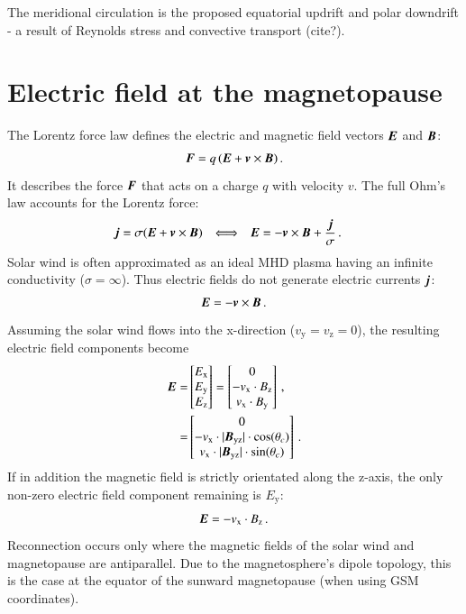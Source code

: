 
The meridional circulation is the proposed equatorial updrift and polar downdrift - a result of Reynolds stress and convective transport (cite?).\\


\section{Electric field at the magnetopause}
\label{sec:electric_field_at_the_magnetopause}
The Lorentz force law defines the electric and magnetic field vectors $\boldsymbol{E}$ and $\boldsymbol{B}$:
\begin{align}
	\boldsymbol{F} = q\,(\boldsymbol{E} + \boldsymbol{v} \times \boldsymbol{B})	\,.
\end{align}
It describes the force $\boldsymbol{F}$ that acts on a charge $q$ with velocity $v$. The full Ohm's law accounts for the Lorentz force:
\begin{align}
	\boldsymbol{j} &= \sigma(\boldsymbol{E} + \boldsymbol{v} \times \boldsymbol{B})	& \Longleftrightarrow	&	&	\boldsymbol{E} &= - \boldsymbol{v} \times \boldsymbol{B} + \frac{\boldsymbol{j}}{\sigma}	\,.
\end{align}
Solar wind is often approximated as an ideal MHD plasma having an infinite conductivity ($\sigma = \infty$). Thus electric fields do not generate electric currents $\boldsymbol{j}$:
\begin{align}
	\boldsymbol{E} = - \boldsymbol{v} \times \boldsymbol{B}	\,.
\end{align}
Assuming the solar wind flows into the x-direction ($v_\text{y} = v_\text{z} = 0$), the resulting electric field components become
\begin{align}
	\boldsymbol{E} =& \begin{bmatrix}
		E_\text{x}\\
		E_\text{y}\\
		E_\text{z}\\
	\end{bmatrix} = \begin{bmatrix}
		0\\
		- v_\text{x} \cdot B_\text{z}\\
		v_\text{x} \cdot B_\text{y}
	\end{bmatrix}	\,,\\
		=& \begin{bmatrix}
		0\\
		- v_\text{x} \cdot |\boldsymbol{B_\text{yz}}| \cdot \cos(\theta_c)\\
		v_\text{x} \cdot |\boldsymbol{B_\text{yz}}| \cdot \sin(\theta_c)\\
	\end{bmatrix}	\,.
\end{align}
If in addition the magnetic field is strictly orientated along the z-axis, the only non-zero electric field component remaining is $E_\text{y}$:
\begin{align}
	\boldsymbol{E} = - v_\text{x} \cdot B_\text{z}	\,.
\end{align}
Reconnection occurs only where the magnetic fields of the solar wind and magnetopause are antiparallel. Due to the magnetosphere's dipole topology, this is the case at the equator of the sunward magnetopause (when using GSM coordinates).


